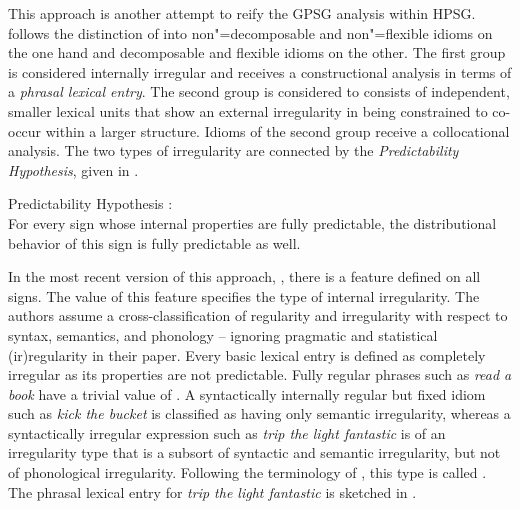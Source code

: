 \documentclass[output=paper]{langsci/langscibook}
\begin{document}
This approach is another attempt to reify the GPSG analysis within HPSG.
\cite{Sailer2000a} follows the distinction of \cite{NSW94a} into non"=decomposable and non"=flexible idioms on the one hand and decomposable and flexible idioms on the other. The first group is considered internally irregular and receives a constructional analysis in terms of a \emph{phrasal lexical entry}. The second group is considered to consists of independent, smaller lexical units that show an external irregularity in being constrained to co-occur within a larger structure. 
Idioms of the second group receive a collocational analysis. The two types of irregularity are connected by the  \emph{Predictability Hypothesis}, given in .

\ea Predictability Hypothesis \citep[]{Sailer2000a}:\label{PredHypo}\\
For every sign whose internal properties are fully predictable, the distributional
behavior of this sign is fully predictable as well.
\z 


In the most recent version of this approach, \cite{Richter:Sailer:09}, there is a feature  defined on all signs. 
The value of this feature specifies the type of internal irregularity. 
The authors assume a cross-classification of regularity and irregularity with respect to syntax, semantics, and phonology -- ignoring pragmatic and statistical (ir)regularity in their paper. 
Every basic lexical entry is defined as completely irregular as its properties are not predictable. 
Fully regular phrases such as \emph{read a book} have a trivial value of . 
A syntactically internally regular but fixed idiom such as \emph{kick the bucket} is classified as having only semantic irregularity, whereas a syntactically irregular expression such as \emph{trip the light fantastic} is of an irregularity type that is a subsort of syntactic and semantic irregularity, but not of phonological irregularity.
Following the terminology of \cite{FKoC88a}, this type is called .
%
The phrasal lexical entry for \emph{trip the light fantastic} is sketched in  .
\end{document}
